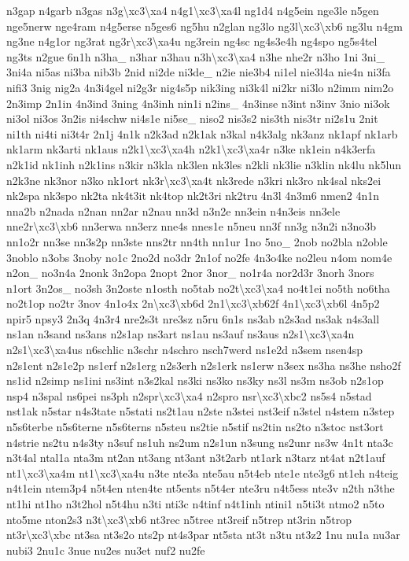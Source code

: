{n3gap n4garb n3gas n3g\textbackslash{}xc3\textbackslash{}xa4 n4g1\textbackslash{}xc3\textbackslash{}xa4l ng1d4 n4g5ein nge3le n5gen nge5nerw nge4ram n4g5erse n5ges6 ng5hu n2glan ng3lo ng3l\textbackslash{}xc3\textbackslash{}xb6 ng3lu n4gm ng3ne n4g1or ng3rat ng3r\textbackslash{}xc3\textbackslash{}xa4u ng3rein ng4sc ng4s3e4h ng4spo ng5s4tel ng3ts n2gue 6n1h n3ha\-\_\- n3har n3hau n3h\textbackslash{}xc3\textbackslash{}xa4 n3he nhe2r n3ho 1ni 3ni\-\_\- 3ni4a ni5as ni3ba nib3b 2nid ni2de ni3de\-\_\- n2ie nie3b4 ni1el nie3l4a nie4n ni3fa nifi3 3nig nig2a 4n3i4gel ni2g3r nig4s5p nik3ing ni3k4l ni2kr ni3lo n2imm nim2o 2n3imp 2n1in 4n3ind 3ning 4n3inh nin1i n2ins\-\_\- 4n3inse n3int n3inv 3nio ni3ok ni3ol ni3os 3n2is ni4schw ni4s1e ni5se\-\_\- niso2 nis3s2 nis3th nis3tr ni2s1u 2nit ni1th ni4ti ni3t4r 2n1j 4n1k n2k3ad n2k1ak n3kal n4k3alg nk3anz nk1apf nk1arb nk1arm nk3arti nk1aus n2k1\textbackslash{}xc3\textbackslash{}xa4h n2k1\textbackslash{}xc3\textbackslash{}xa4r n3ke nk1ein n4k3erfa n2k1id nk1inh n2k1ins n3kir n3kla nk3len nk3les n2kli nk3lie n3klin nk4lu nk5lun n2k3ne nk3nor n3ko nk1ort nk3r\textbackslash{}xc3\textbackslash{}xa4t nk3rede n3kri nk3ro nk4sal nks2ei nk2spa nk3spo nk2ta nk4t3it nk4top nk2t3ri nk2tru 4n3l 4n3m6 nmen2 4n1n nna2b n2nada n2nan nn2ar n2nau nn3d n3n2e nn3ein n4n3eis nn3ele nne2r\textbackslash{}xc3\textbackslash{}xb6 nn3erwa nn3erz nne4s nnes1e n5neu nn3f nn3g n3n2i n3no3b nn1o2r nn3se nn3s2p nn3ste nns2tr nn4th nn1ur 1no 5no\-\_\- 2nob no2bla n2oble 3noblo n3obs 3noby no1c 2no2d no3dr 2n1of no2fe 4n3o4ke no2leu n4om nom4e n2on\-\_\- no3n4a 2nonk 3n2opa 2nopt 2nor 3nor\-\_\- no1r4a nor2d3r 3norh 3nors n1ort 3n2os\-\_\- no3sh 3n2oste n1osth no5tab no2t\textbackslash{}xc3\textbackslash{}xa4 no4t1ei no5th no6tha no2t1op no2tr 3nov 4n1o4x 2n\textbackslash{}xc3\textbackslash{}xb6d 2n1\textbackslash{}xc3\textbackslash{}xb62f 4n1\textbackslash{}xc3\textbackslash{}xb6l 4n5p2 npir5 npsy3 2n3q 4n3r4 nre2s3t nre3sz n5ru 6n1s ns3ab n2s3ad ns3ak n4s3all ns1an n3sand ns3ans n2s1ap ns3art ns1au ns3auf ns3aus n2s1\textbackslash{}xc3\textbackslash{}xa4n n2s1\textbackslash{}xc3\textbackslash{}xa4us n6schlic n3schr n4schro nsch7werd ns1e2d n3sem nsen4sp n2s1ent n2s1e2p ns1erf n2s1erg n2s3erh n2s1erk ns1erw n3sex ns3ha ns3he nsho2f ns1id n2simp ns1ini ns3int n3s2kal ns3ki ns3ko ns3ky ns3l ns3m ns3ob n2s1op nsp4 n3spal ns6pei ns3ph n2spr\textbackslash{}xc3\textbackslash{}xa4 n2spro nsr\textbackslash{}xc3\textbackslash{}xbc2 ns5s4 n5stad nst1ak n5star n4s3tate n5stati ns2t1au n2ste n3stei nst3eif n3stel n4stem n3step n5s6terbe n5s6terne n5s6terns n5steu ns2tie n5stif ns2tin ns2to n3stoc nst3ort n4strie ns2tu n4s3ty n3suf ns1uh ns2um n2s1un n3sung ns2unr ns3w 4n1t nta3c n3t4al ntal1a nta3m nt2an nt3ang nt3ant n3t2arb nt1ark n3tarz nt4at n2t1auf nt1\textbackslash{}xc3\textbackslash{}xa4m nt1\textbackslash{}xc3\textbackslash{}xa4u n3te nte3a nte5au n5t4eb nte1e nte3g6 nt1eh n4teig n4t1ein ntem3p4 n5t4en nten4te nt5ents n5t4er nte3ru n4t5ess nte3v n2th n3the nt1hi nt1ho n3t2hol n5t4hu n3ti nti3c n4tinf n4t1inh ntini1 n5ti3t ntmo2 n5to nto5me nton2s3 n3t\textbackslash{}xc3\textbackslash{}xb6 nt3rec n5tree nt3reif n5trep nt3rin n5trop nt3r\textbackslash{}xc3\textbackslash{}xbc nt3sa nt3s2o nts2p nt4s3par nt5sta nt3t n3tu nt3z2 1nu nu1a nu3ar nubi3 2nu1c 3nue nu2es nu3et nuf2 nu2fe }
